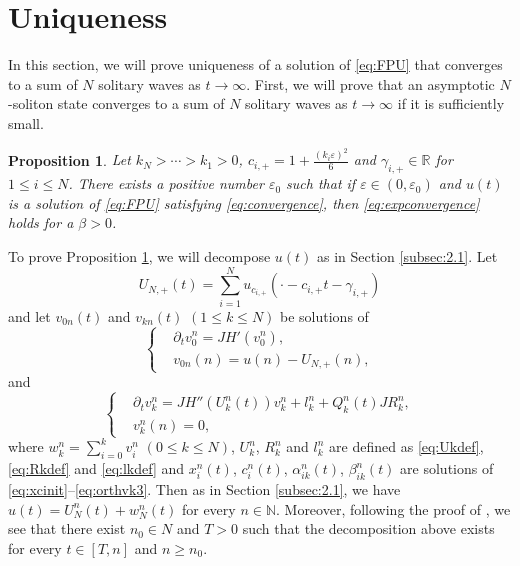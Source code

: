 \documentclass[11pt]{amsart}
\newtheorem{proposition}[theorem]{Proposition}
\theoremstyle{remark}
\numberwithin{equation}{section}
\begin{document}
\section{Uniqueness}
\label{sec:uniqueness}
In this section, we will prove uniqueness of a solution of \eqref{eq:FPU}
that converges to a sum of $N$ solitary waves as $t\to\infty$.
First, we will prove that an asymptotic $N$-soliton state converges to
a sum of $N$ solitary waves as $t\to\infty$ if it is sufficiently small.
\begin{proposition}
  \label{prop:expconv}
Let $k_{N}>\cdots>k_1>0$, $c_{i,+}=1+\frac{(k_i{\varepsilon})^2}{6}$ and $\gamma_{i,+}\in{\mathbb{R}}$
for $1\le i\le N$. There exists a positive number ${\varepsilon}_0$ such that if
${\varepsilon}\in(0,{\varepsilon}_0)$ and $u(t)$ is a solution of \eqref{eq:FPU} satisfying
\eqref{eq:convergence}, then \eqref{eq:expconvergence} holds for a $\beta>0$.
\end{proposition}
To prove Proposition \ref{prop:expconv}, we will decompose $u(t)$
as in Section \ref{subsec:2.1}.
Let $$U_{N,+}(t)=\sum_{i=1}^Nu_{c_{i,+}}(\cdot-c_{i,+}t-\gamma_{i,+})$$ and let
$v_{0n}(t)$ and $v_{kn}(t)$ $(1\le k\le N)$ be solutions of
\begin{equation}
  \label{eq:v0n}
  \left\{
    \begin{aligned}
& {\partial}_tv_0^n=JH'(v_0^n),\\
& v_{0n}(n)=u(n)-U_{N,+}(n),
    \end{aligned}\right.
\end{equation}
and
\begin{equation}
  \label{eq:vkn}\left\{
  \begin{aligned}
&  {\partial}_tv_k^n=JH''(U_k^n(t))v_k^n+l_k^n+Q_k^n(t)JR_k^n,\\
& v_k^n(n)=0,
  \end{aligned}\right.
\end{equation}
where $w_k^n=\sum_{i=0}^kv_i^n$ $(0\le k\le N)$, $U_k^n$, $R_k^n$ and $l_k^n$
are defined as \eqref{eq:Ukdef}, \eqref{eq:Rkdef} and \eqref{eq:lkdef} and
$x_i^n(t)$, $c_i^n(t)$, $\alpha_{ik}^n(t)$, $\beta_{ik}^n(t)$ are
solutions of \eqref{eq:xcinit}--\eqref{eq:orthvk3}.
Then as in Section \ref{subsec:2.1}, we have $u(t)=U_N^n(t)+w_N^n(t)$
for every $n\in{\mathbb{N}}$. Moreover, following the proof of \cite[Lemmas 4.1 and 4.2]
{Mi2}, we see that there exist $n_0\in N$ and $T>0$ such that
the decomposition above exists for every $t\in [T,n]$ and $n\ge n_0$.
\end{document}

